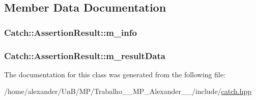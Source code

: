 \subsection{Member Data Documentation}
\hypertarget{classCatch_1_1AssertionResult_a3e7236f73a51d6fc8bb9dfdefcee7772}{
\subsubsection[{m\-\_\-info}]{ Catch\-::\-Assertion\-Result\-::m\-\_\-info\hspace{0.3cm}{\ttfamily [protected]}}}\label{classCatch_1_1AssertionResult_a3e7236f73a51d6fc8bb9dfdefcee7772}
\hypertarget{classCatch_1_1AssertionResult_add3455b8bbedb0d643e18da67c66b4f7}{
\subsubsection[{m\-\_\-result\-Data}]{ Catch\-::\-Assertion\-Result\-::m\-\_\-result\-Data\hspace{0.3cm}{\ttfamily [protected]}}}\label{classCatch_1_1AssertionResult_add3455b8bbedb0d643e18da67c66b4f7}


The documentation for this class was generated from the following file\-:\begin{DoxyCompactItemize}
\item 
/home/alexander/\-Un\-B/\-M\-P/\-Trabalho\-\_\-\_\-\-M\-P\-\_\-\-Alexander\-\_\-\_/include/\hyperlink{catch_8hpp}{catch.\-hpp}\end{DoxyCompactItemize}
